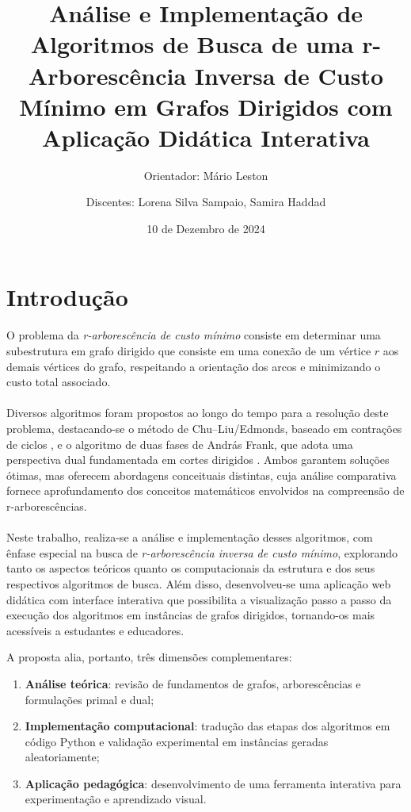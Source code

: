 \documentclass[12pt,a4paper]{article}
\title{Análise e Implementação de Algoritmos de Busca de uma r-Arborescência Inversa de Custo Mínimo em Grafos Dirigidos com Aplicação Didática Interativa}
\author{Orientador: Mário Leston 
\and Discentes: Lorena Silva Sampaio, Samira Haddad}
\date{10 de Dezembro de 2024}
\begin{document}
\maketitle

\section{Introdução}

\paragraph{}
O problema da \textit{r-arborescência de custo mínimo} consiste em determinar uma subestrutura em grafo dirigido que consiste em uma conexão de um vértice \(r\) aos demais vértices do grafo, respeitando a orientação dos arcos e minimizando o custo total associado.  

\paragraph{}
Diversos algoritmos foram propostos ao longo do tempo para a resolução deste problema, destacando-se o método de Chu--Liu/Edmonds, baseado em contrações de ciclos \cite{chu1965,edmonds1967optimum}, e o algoritmo de duas fases de András Frank, que adota uma perspectiva dual fundamentada em cortes dirigidos \cite{frank2014}. Ambos garantem soluções ótimas, mas oferecem abordagens conceituais distintas, cuja análise comparativa fornece aprofundamento dos conceitos matemáticos envolvidos na compreensão de r-arborescências.  

\paragraph{}
Neste trabalho, realiza-se a análise e implementação desses algoritmos, com ênfase especial na busca de \textit{r-arborescência inversa de custo mínimo}, explorando tanto os aspectos teóricos quanto os computacionais da estrutura e dos seus respectivos algoritmos de busca. Além disso, desenvolveu-se uma aplicação web didática com interface interativa que possibilita a visualização passo a passo da execução dos algoritmos em instâncias de grafos dirigidos, tornando-os mais acessíveis a estudantes e educadores.  

A proposta alia, portanto, três dimensões complementares:  
\begin{enumerate}
    \item \textbf{Análise teórica}: revisão de fundamentos de grafos, arborescências e formulações primal e dual;
    \item \textbf{Implementação computacional}: tradução das etapas dos algoritmos em código Python e validação experimental em instâncias geradas aleatoriamente;
    \item \textbf{Aplicação pedagógica}: desenvolvimento de uma ferramenta interativa para experimentação e aprendizado visual.
\end{enumerate}
\end{document}
